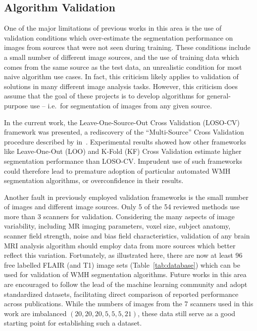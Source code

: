 \subsection{Algorithm Validation}
One of the major limitations of previous works in this area
is the use of validation conditions which over-estimate
the segmentation performance on images from sources that
were not seen during training.
These conditions include a small number of different image sources,
and the use of training data which comes from the same source as the test data,
an unrealistic condition for most naive algorithm use cases.
In fact, this criticism likely applies to
validation of solutions in many different image analysis tasks.
However, this criticism does assume that the goal of these projects is to develop
algorithms for general-purpose use
-- i.e.\ for segmentation of images from any given source.
\par
In the current work, the Leave-One-Source-Out Cross Validation (LOSO-CV) framework was presented,
a rediscovery of the ``Multi-Source'' Cross Validation procedure
described by \citeauthor{Geras2013} in~\cite{Geras2013}.
Experimental results showed how other frameworks like
Leave-One-Out (LOO) and K-Fold (KF) Cross Validation
estimate higher segmentation performance than LOSO-CV.
Imprudent use of such frameworks could therefore lead to
premature adoption of particular automated WMH segmentation algorithms,
or overconfidence in their results.
\par
Another fault in previously employed validation frameworks is
the small number of images and different image sources.
Only 5 of the 54 reviewed methods use more than 3 scanners for validation.
Considering the many aspects of image variability, including
MR imaging parameters,
voxel size,
subject anatomy,
scanner field strength, noise and bias field characteristics,
validation of any brain MRI analysis algorithm
should employ data from more sources which better reflect this variation.
Fortunately, as illustrated here, there are now at least 96 free labelled FLAIR (and T1) image sets
(Table~\ref{tab:database})
which can be used for validation of WMH segmentation algorithms.
Future works in this area are encouraged to follow the lead of the machine learning community
and adopt standardized datasets, facilitating direct comparison of reported performance
across publications.
While the numbers of images from the 7 scanners used in this work are imbalanced
$(20,20,20,5,5,5,21)$,
these data still serve as a good starting point for establishing such a dataset.
